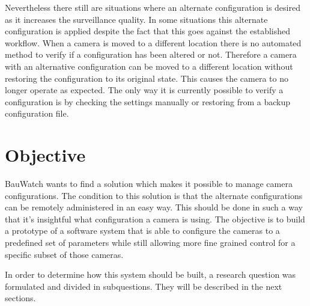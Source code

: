 Nevertheless there still are situations where an alternate configuration is desired as it increases the surveillance quality.
In some situations this alternate configuration is applied despite the fact that this goes against the established workflow.
When a camera is moved to a different location there is no automated method to verify if a configuration has been altered or not.
Therefore a camera with an alternative configuration can be moved to a different location without restoring the configuration to its original state.
This causes the camera to no longer operate as expected.
The only way it is currently possible to verify a configuration is by checking the settings manually or restoring from a backup configuration file.


\section{Objective}
BauWatch wants to find a solution which makes it possible to manage camera configurations.
The condition to this solution is that the alternate configurations can be remotely administered in an easy way.
This should be done in such a way that it's insightful what configuration a camera is using.
The objective is to build a prototype of a software system that is able to configure the cameras to a predefined set of parameters while still allowing
more fine grained control for a specific subset of those cameras.

In order to determine how this system should be built, a research question was formulated and divided in subquestions. They will be described in the next sections.



